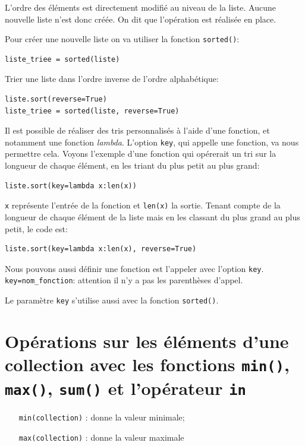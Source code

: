 \documentclass[a4paper,12pt]{book}
\begin{document}
L'ordre des éléments est directement modifié au niveau de la liste. Aucune nouvelle liste n'est donc créée. On dit que l'opération est réalisée \og en place\fg{}.
\medskip

Pour créer une nouvelle liste on va utiliser la fonction \texttt{sorted()}:
\begin{lstlisting}
liste_triee = sorted(liste)
\end{lstlisting}
\medskip

Trier une liste dans l'ordre inverse de l'ordre alphabétique:
\begin{lstlisting}
liste.sort(reverse=True)
liste_triee = sorted(liste, reverse=True)
\end{lstlisting}
\medskip

Il est possible de réaliser des tris personnalisés à l'aide d'une fonction, et notamment une fonction \textit{lambda}. L'option \texttt{key}, qui appelle une fonction, va nous permettre cela. Voyons l'exemple d'une fonction qui opérerait un tri sur la longueur de chaque élément, en les triant du plus petit au plus grand:
\begin{lstlisting}
liste.sort(key=lambda x:len(x))
\end{lstlisting}
\medskip

\texttt{x} représente l'entrée de la fonction et \texttt{len(x)} la sortie. Tenant compte de la longueur de chaque élément de la liste mais en les classant du plus grand au plus petit, le code est:
\begin{lstlisting}
liste.sort(key=lambda x:len(x), reverse=True)
\end{lstlisting}
\medskip

Nous pouvons aussi définir une fonction est l'appeler avec l'option \texttt{key}. \texttt{key=nom\_fonction}: attention il n'y a pas les parenthèses d'appel.
\medskip

Le paramètre \texttt{key} s'utilise aussi avec la fonction \texttt{sorted()}.
\medskip

\section{Opérations sur les éléments d'une collection avec les fonctions \texttt{min()}, \texttt{max()}, \texttt{sum()} et l'opérateur \texttt{in}}
\begin{itemize}
	\item[\texttt{min(collection)}]: donne la valeur minimale;
	\item[\texttt{max(collection)}]: donne la valeur maximale
\end{itemize}
\medskip
\end{document}
